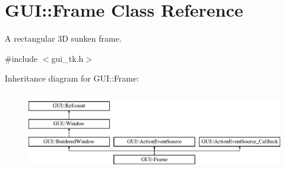 \hypertarget{classGUI_1_1Frame}{\section{G\-U\-I\-:\-:Frame Class Reference}
\label{classGUI_1_1Frame}
}


A rectangular 3\-D sunken frame.  




{\ttfamily \#include $<$gui\-\_\-tk.\-h$>$}

Inheritance diagram for G\-U\-I\-:\-:Frame\-:\begin{figure}[H]
\begin{center}
\leavevmode
\includegraphics[height=3.538705cm]{classGUI_1_1Frame}
\end{center}
\end{figure}
